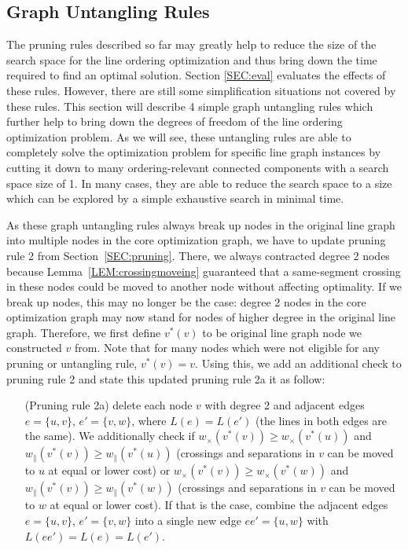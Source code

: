 \documentclass[sigconf]{acmart}
\begin{document}
\subsection{Graph Untangling Rules}

The pruning rules described so far may greatly help to reduce the size of the search space for the line ordering optimization and thus bring down the time required to find an optimal solution. Section \ref{SEC:eval} evaluates the effects of these rules. However, there are still some simplification situations not covered by these rules. This section will describe 4 simple graph untangling rules which further help to bring down the degrees of freedom of the line ordering optimization problem. As we will see, these untangling rules are able to completely solve the optimization problem for specific line graph instances by cutting it down to many ordering-relevant connected components with a search space size of 1. In many cases, they are able to reduce the search space to a size which can be explored by a simple exhaustive search in minimal time.

As these graph untangling rules always break up nodes in the original line graph into multiple nodes in the core optimization graph, we have to update pruning rule 2 from Section~\ref{SEC:pruning}. There, we always contracted degree 2 nodes because Lemma~\ref{LEM:crossingmoveing} guaranteed that a same-segment crossing in these nodes could be moved to another node without affecting optimality. If we break up nodes, this may no longer be the case: degree 2 nodes in the core optimization graph may now stand for nodes of higher degree in the original line graph. Therefore, we first define $v^*(v)$ to be original line graph node we constructed $v$ from. Note that for many nodes which were not eligible for any pruning or untangling rule, $v^*(v) = v$. Using this, we add an additional check to pruning rule 2 and state this updated pruning rule 2a it as follow:
\begin{enumerate}[parsep=0.5mm, wide, labelwidth=0mm, itemindent=2.3mm]
  \setlength\itemsep{1pt}
  \item[(Pruning rule 2a)] delete each node $v$ with degree 2 and adjacent edges $e = \{u, v\}$, $e' = \{v, w\}$,
  where 
  $L(e) = L(e')$ (the lines in both edges are the same). We additionally check if
  $w_\times(v^*(v)) \geq w_\times(v^*(u))$ and $w_\|(v^*(v)) \geq w_\|(v^*(u))$ (crossings and separations in $v$ can be moved to $u$ at equal or lower cost) 
  or
  $w_\times(v^*(v)) \geq w_\times(v^*(w))$ and $w_\|(v^*(v)) \geq w_\|(v^*(w))$ (crossings and separations in $v$ can be moved to $w$ at equal or lower cost). If that is the case, combine the adjacent edges $e = \{u, v\}$, $e' = \{v, w\}$ into a single new edge $ee' = \{u, w\}$ with $L(ee') = L(e) = L(e')$.
\end{enumerate}
\end{document}
